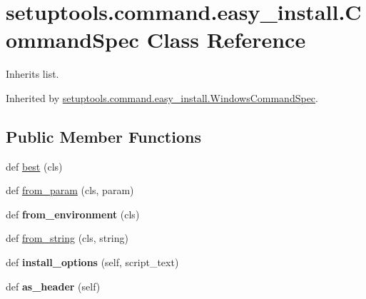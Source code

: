 \hypertarget{classsetuptools_1_1command_1_1easy__install_1_1_command_spec}{}\section{setuptools.\+command.\+easy\+\_\+install.\+Command\+Spec Class Reference}
\label{classsetuptools_1_1command_1_1easy__install_1_1_command_spec}


Inherits list.



Inherited by \hyperlink{classsetuptools_1_1command_1_1easy__install_1_1_windows_command_spec}{setuptools.\+command.\+easy\+\_\+install.\+Windows\+Command\+Spec}.

\subsection*{Public Member Functions}
\begin{DoxyCompactItemize}
\item 
def \hyperlink{classsetuptools_1_1command_1_1easy__install_1_1_command_spec_ac2ba0db896d483306a07e374489f412f}{best} (cls)
\item 
def \hyperlink{classsetuptools_1_1command_1_1easy__install_1_1_command_spec_a07cdc7c1776648e9e7219dc9b48a4b02}{from\+\_\+param} (cls, param)
\item 
\mbox{\label{classsetuptools_1_1command_1_1easy__install_1_1_command_spec_af4913f12e889edaf084283405069b1ae}} 
def {\bfseries from\+\_\+environment} (cls)
\item 
def \hyperlink{classsetuptools_1_1command_1_1easy__install_1_1_command_spec_a06561ebbceb860d5733127793c5896dc}{from\+\_\+string} (cls, string)
\item 
\mbox{\label{classsetuptools_1_1command_1_1easy__install_1_1_command_spec_a039822c09205774f5c43d7dced759696}} 
def {\bfseries install\+\_\+options} (self, script\+\_\+text)
\item 
\mbox{\label{classsetuptools_1_1command_1_1easy__install_1_1_command_spec_aa60f3c4d8e0502a97722c9a91fd94594}} 
def {\bfseries as\+\_\+header} (self)
\end{DoxyCompactItemize}
